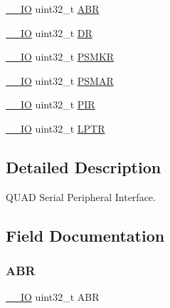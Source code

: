 \begin{DoxyCompactItemize}
\mbox{\hyperlink{core__sc300_8h_aec43007d9998a0a0e01faede4133d6be}{\+\_\+\+\_\+\+IO}} uint32\+\_\+t \mbox{\hyperlink{struct_q_u_a_d_s_p_i___type_def_a53d4126533b52183ef8105af2e526bd0}{A\+BR}}
\item 
\mbox{\hyperlink{core__sc300_8h_aec43007d9998a0a0e01faede4133d6be}{\+\_\+\+\_\+\+IO}} uint32\+\_\+t \mbox{\hyperlink{struct_q_u_a_d_s_p_i___type_def_a3df0d8dfcd1ec958659ffe21eb64fa94}{DR}}
\item 
\mbox{\hyperlink{core__sc300_8h_aec43007d9998a0a0e01faede4133d6be}{\+\_\+\+\_\+\+IO}} uint32\+\_\+t \mbox{\hyperlink{struct_q_u_a_d_s_p_i___type_def_a7327d5955c8e4e3eb689a7ad2a1fa219}{P\+S\+M\+KR}}
\item 
\mbox{\hyperlink{core__sc300_8h_aec43007d9998a0a0e01faede4133d6be}{\+\_\+\+\_\+\+IO}} uint32\+\_\+t \mbox{\hyperlink{struct_q_u_a_d_s_p_i___type_def_a986e18db58469e5dd0e756b2b405b805}{P\+S\+M\+AR}}
\item 
\mbox{\hyperlink{core__sc300_8h_aec43007d9998a0a0e01faede4133d6be}{\+\_\+\+\_\+\+IO}} uint32\+\_\+t \mbox{\hyperlink{struct_q_u_a_d_s_p_i___type_def_aa9e54bfb9deb2d92de2c3f62d33793da}{P\+IR}}
\item 
\mbox{\hyperlink{core__sc300_8h_aec43007d9998a0a0e01faede4133d6be}{\+\_\+\+\_\+\+IO}} uint32\+\_\+t \mbox{\hyperlink{struct_q_u_a_d_s_p_i___type_def_ae060e16fd0b193203ddead99622260c1}{L\+P\+TR}}
\end{DoxyCompactItemize}


\subsection{Detailed Description}
Q\+U\+AD Serial Peripheral Interface. 

\subsection{Field Documentation}
\mbox{\label{struct_q_u_a_d_s_p_i___type_def_a53d4126533b52183ef8105af2e526bd0}} 
\subsubsection{\texorpdfstring{A\+BR}{ABR}}
{\footnotesize\ttfamily \mbox{\hyperlink{core__sc300_8h_aec43007d9998a0a0e01faede4133d6be}{\+\_\+\+\_\+\+IO}} uint32\+\_\+t A\+BR}

